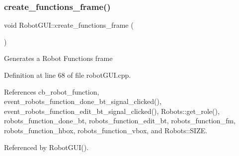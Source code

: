 \subsubsection{\texorpdfstring{create\+\_\+functions\+\_\+frame()}{create\_functions\_frame()}}
{\footnotesize\ttfamily void Robot\+G\+U\+I\+::create\+\_\+functions\+\_\+frame (\begin{DoxyParamCaption}{ }\end{DoxyParamCaption})\hspace{0.3cm}{\ttfamily [private]}}

Generates a Robot Functions frame 

Definition at line 68 of file robot\+G\+U\+I.\+cpp.



References cb\+\_\+robot\+\_\+function, event\+\_\+robots\+\_\+function\+\_\+done\+\_\+bt\+\_\+signal\+\_\+clicked(), event\+\_\+robots\+\_\+function\+\_\+edit\+\_\+bt\+\_\+signal\+\_\+clicked(), Robots\+::get\+\_\+role(), robots\+\_\+function\+\_\+done\+\_\+bt, robots\+\_\+function\+\_\+edit\+\_\+bt, robots\+\_\+function\+\_\+fm, robots\+\_\+function\+\_\+hbox, robots\+\_\+function\+\_\+vbox, and Robots\+::\+S\+I\+ZE.



Referenced by Robot\+G\+U\+I().


